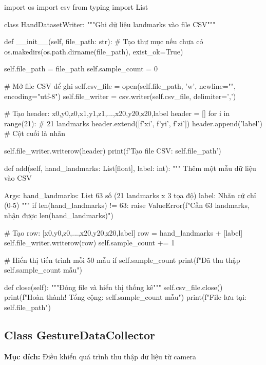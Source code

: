 \begin{aivncodebox}
\begin{python}
import os
import csv
from typing import List

class HandDatasetWriter:
    """Ghi dữ liệu landmarks vào file CSV"""
    
    def __init__(self, file_path: str):
        # Tạo thư mục nếu chưa có
        os.makedirs(os.path.dirname(file_path), exist_ok=True)
        
        self.file_path = file_path
        self.sample_count = 0
        
        # Mở file CSV để ghi
        self.csv_file = open(self.file_path, 'w', newline="", encoding="utf-8")
        self.file_writer = csv.writer(self.csv_file, delimiter=',')
        
        # Tạo header: x0,y0,z0,x1,y1,z1,...,x20,y20,z20,label
        header = []
        for i in range(21):  # 21 landmarks
            header.extend([f'x{i}', f'y{i}', f'z{i}'])
        header.append('label')  # Cột cuối là nhãn
        
        self.file_writer.writerow(header)
        print(f'Tạo file CSV: {self.file_path}')
    
    def add(self, hand_landmarks: List[float], label: int):
        """
        Thêm một mẫu dữ liệu vào CSV
        
        Args:
            hand_landmarks: List 63 số (21 landmarks x 3 tọa độ)
            label: Nhãn cử chỉ (0-5)
        """
        if len(hand_landmarks) != 63:
            raise ValueError(f"Cần 63 landmarks, nhận được {len(hand_landmarks)}")
        
        # Tạo row: [x0,y0,z0,...,x20,y20,z20,label]
        row = hand_landmarks + [label]
        self.file_writer.writerow(row)
        self.sample_count += 1
        
        # Hiển thị tiến trình mỗi 50 mẫu
        if self.sample_count %
            print(f"Đã thu thập {self.sample_count} mẫu")
    
    def close(self):
        """Đóng file và hiển thị thống kê"""
        self.csv_file.close()
        print(f"Hoàn thành! Tổng cộng: {self.sample_count} mẫu")
        print(f"File lưu tại: {self.file_path}")
\end{python}
\end{aivncodebox}

\subsection{Class GestureDataCollector}
\textbf{Mục đích:} Điều khiển quá trình thu thập dữ liệu từ camera

